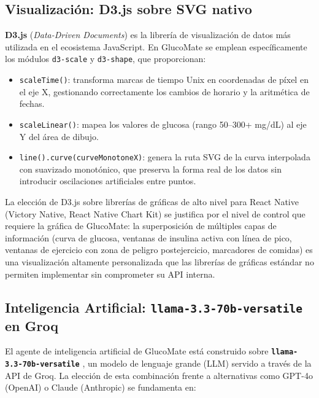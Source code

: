 \subsection{Visualización: D3.js sobre SVG nativo}
\label{subsec:herramienta-d3}

\textbf{D3.js} (\textit{Data-Driven Documents}) \cite{bostock2011d3} es la librería de
visualización de datos más utilizada en el ecosistema JavaScript. En GlucoMate se emplean
específicamente los módulos \texttt{d3-scale} y \texttt{d3-shape}, que proporcionan:

\begin{itemize}
    \item \texttt{scaleTime()}: transforma marcas de tiempo Unix en coordenadas
          de píxel en el eje X, gestionando correctamente los cambios de horario y
          la aritmética de fechas.
    \item \texttt{scaleLinear()}: mapea los valores de glucosa (rango 50–300+ mg/dL)
          al eje Y del área de dibujo.
    \item \texttt{line().curve(curveMonotoneX)}: genera la ruta SVG de la curva
          interpolada con suavizado monotónico, que preserva la forma real de los datos
          sin introducir oscilaciones artificiales entre puntos.
\end{itemize}

La elección de D3.js sobre librerías de gráficas de alto nivel para React Native
(Victory Native, React Native Chart Kit) se justifica por el nivel de control que
requiere la gráfica de GlucoMate: la superposición de múltiples capas de información
(curva de glucosa, ventanas de insulina activa con línea de pico, ventanas de ejercicio
con zona de peligro postejercicio, marcadores de comidas) es una visualización altamente
personalizada que las librerías de gráficas estándar no permiten implementar sin
comprometer su API interna.

\subsection{Inteligencia Artificial: \texttt{llama-3.3-70b-versatile} en Groq}
\label{subsec:herramienta-llama-groq}

El agente de inteligencia artificial de GlucoMate está construido sobre
\textbf{\texttt{llama-3.3-70b-versatile}} \cite{groq2026llama}, un modelo de lenguaje
grande (LLM) servido a través de la API de Groq. La elección de esta combinación frente
a alternativas como GPT-4o (OpenAI) o Claude (Anthropic) se fundamenta en:

